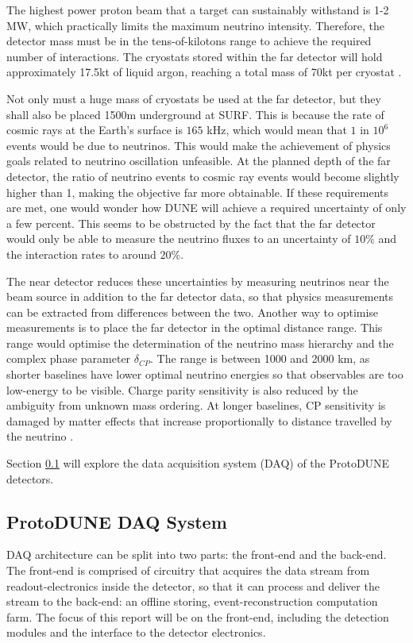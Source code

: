 \documentclass[10pt]{article}
\begin{document}
The highest power proton beam that a target can sustainably withstand is 1-2 MW, which practically limits the maximum neutrino intensity. Therefore, the detector mass must be in the tens-of-kilotons range to achieve the required number of interactions. The cryostats stored within the far detector will hold approximately 17.5kt of liquid argon, reaching a total mass of 70kt per cryostat \cite{abi2020volume}.

Not only must a huge mass of cryostats be used at the far detector, but they shall also be placed 1500m underground at SURF. This is because the rate of cosmic rays at the Earth's surface is $165$ kHz, which would mean that $1$ in $10^6$ events would be due to neutrinos. This would make the achievement of physics goals related to neutrino oscillation unfeasible. At the planned depth of the far detector, the ratio of neutrino events to cosmic ray events would become slightly higher than 1, making the objective far more obtainable. If these requirements are met, one would wonder how DUNE will achieve a required uncertainty of only a few percent. This seems to be obstructed by the fact that the far detector would only be able to measure the neutrino fluxes to an uncertainty of $10\%$ and the interaction rates to around $20\%$.

The near detector reduces these uncertainties by measuring neutrinos near the beam source in addition to the far detector data, so that physics measurements can be extracted from differences between the two. Another way to optimise measurements is to place the far detector in the optimal distance range. This range would optimise the determination of the neutrino mass hierarchy and the complex phase parameter $\delta_{CP}$. The range is between 1000 and 2000 km, as shorter baselines have lower optimal neutrino energies so that observables are too low-energy to be visible. Charge parity sensitivity is also reduced by the ambiguity from unknown mass ordering. At longer baselines, CP sensitivity is damaged by matter effects that increase proportionally to distance travelled by the neutrino \cite{abi2020volume}. 

Section \ref{section:overview} will explore the data acquisition system (DAQ) of the ProtoDUNE detectors. 

\subsection{ProtoDUNE DAQ System}\label{section:overview}

DAQ architecture can be split into two parts: the front-end and the back-end. The front-end is comprised of circuitry that acquires the data stream from readout-electronics inside the  detector, so that it can process and deliver the stream to the back-end: an offline storing, event-reconstruction computation farm. The focus of this report will be on the front-end, including the detection modules and the interface to the detector electronics.
\end{document}
